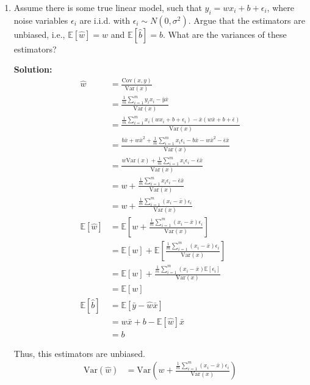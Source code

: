 \documentclass[letter, 12pt]{article}
\begin{document}
\begin{enumerate}
    	\item{
    		Assume there is some true linear model, such that $ y_i = wx_i + b + \epsilon_i $, where noise variables $ \epsilon_i $ are i.i.d. with $ \epsilon_i \sim N (0, \sigma^2) $. Argue that the estimators are unbiased, i.e., $ \mathbb{E} [\hat{w}] = w $ and $ \mathbb{E}[\hat{b}] = b $. What are the variances of these estimators?
    	}
    	\par{\textbf{Solution:}}
    	\begin{align*}
    		\hat{w} &= \frac{\text{Cov}(x, y)}{\text{Var}(x)} \\
    		&= \frac{\frac{1}{m}\sum_{i=1}^{m} y_i x_i - \bar{y} \bar{x}}{\text{Var}(x)} \\
    		&= \frac{\frac{1}{m}\sum_{i=1}^{m} x_i (wx_i + b + \epsilon_i) -  \bar{x} (w\bar{x} + b + \bar{\epsilon})}{\text{Var}(x)} \\
    		&= \frac{b \bar{x} + w \bar{x}^2 + \frac{1}{m}\sum_{i=1}^{m} x_i \epsilon_i - b \bar{x} - w\bar{x}^2 - \bar{\epsilon}\bar{x}}{\text{Var}(x)} \\
    		&= \frac{w\text{Var}(x) + \frac{1}{m}\sum_{i=1}^{m} x_i \epsilon_i - \bar{\epsilon}\bar{x}}{\text{Var}(x)} \\
    		&= w + \frac{\frac{1}{m}\sum_{i=1}^{m} x_i \epsilon_i - \bar{\epsilon}\bar{x}}{\text{Var}(x)} \\
    		&= w + \frac{\frac{1}{m}\sum_{i=1}^{m} (x_i - \bar{x})\epsilon_i}{\text{Var}(x)} \\
    		\mathbb{E}[\hat{w}] &= \mathbb{E}[w + \frac{\frac{1}{m}\sum_{i=1}^{m} (x_i - \bar{x})\epsilon_i}{\text{Var}(x)}] \\
    		&= \mathbb{E}[w] + \mathbb{E}[\frac{\frac{1}{m}\sum_{i=1}^{m} (x_i - \bar{x})\epsilon_i}{\text{Var}(x)}] \\
    		&= \mathbb{E}[w] + \frac{\frac{1}{m}\sum_{i=1}^{m} (x_i - \bar{x})\mathbb{E}[\epsilon_i]}{\text{Var}(x)} \\
    		&= \mathbb{E}[w] \\
    		\mathbb{E}[\hat{b}] &= \mathbb{E}[\bar{y} - \hat{w}\bar{x}] \\
    		&= w\bar{x} + b - \mathbb{E}[\hat{w}]\bar{x} \\
    		&= b
    	\end{align*}
    	\par{Thus, this estimators are unbiased.}
    	\begin{align*}
    		\text{Var}(\hat{w}) &= \text{Var}(w + \frac{\frac{1}{m}\sum_{i=1}^{m} (x_i - \bar{x})\epsilon_i}{\text{Var}(x)}) \\

\end{align*}
\end{enumerate}
\end{document}
